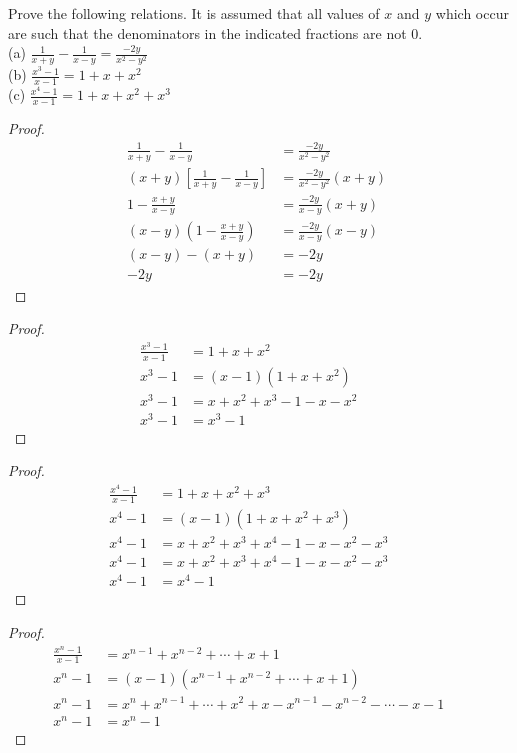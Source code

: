 \begin{tcolorbox}[title=Problem 2, breakable]
Prove the following relations. It is assumed that all values of $x$ and $y$
which occur are such that the denominators in the indicated fractions are not $0$. \\
(a) $\frac{1}{x + y} - \frac{1}{x - y} = \frac{-2y}{x^2 - y^2}$ \\
(b) $\frac{x^3 - 1}{x - 1} = 1 + x + x^2$ \\
(c) $\frac{x^4 - 1}{x - 1} = 1 + x + x^2 + x^3$
\end{tcolorbox}

\begin{proof}
\begin{align*}
\frac{1}{x + y} - \frac{1}{x - y} &= \frac{-2y}{x^2 - y^2} \\
(x + y)[\frac{1}{x + y} - \frac{1}{x - y}] &= \frac{-2y}{x^2 - y^2}(x + y) \\
1 - \frac{x + y}{x - y} &= \frac{-2y}{x - y}(x + y) \\
(x - y)(1 - \frac{x + y}{x - y}) &= \frac{-2y}{x - y}(x - y) \quad \text{} \\
(x - y) - (x + y) &= -2y\\
-2y &= -2y
\end{align*}
\end{proof}
\begin{proof}
\begin{align*}
\frac{x^3 - 1}{x - 1} &= 1 + x + x^2 && \\
x^3 - 1 &= (x-1)(1 + x + x^2) && \\
x^3 - 1 &= x + x^2 + x^3 - 1 - x - x^2  && \\
x^3 - 1 &= x^3 - 1
\end{align*}
\end{proof}
\begin{proof}
\begin{align*}
\frac{x^4 - 1}{x - 1} &= 1 + x + x^2 + x^3 && \\
x^4 - 1 &= (x - 1)(1 + x + x^2 + x^3) && \\
x^4 - 1 &= x + x^2 + x^3 + x^4 - 1 - x - x^2 - x^3 && \\
x^4 - 1 &= x + x^2 + x^3 + x^4 - 1 - x - x^2 - x^3 && \\
x^4 - 1 &= x^4 - 1
\end{align*}
\end{proof}
\begin{proof}
\begin{align*}
\frac{x^n - 1}{x - 1} &= x^{n - 1} + x^{n - 2} + \cdots + x + 1 && \\
x^n - 1 &= (x - 1)(x^{n - 1} + x^{n - 2} + \cdots + x + 1) && \\
x^n - 1 &= x^{n} + x^{n - 1} + \cdots + x^2 + x - x^{n - 1} - x^{n - 2} - \cdots -x - 1  && \\
x^n - 1 &= x^n - 1
\end{align*}
\end{proof}

